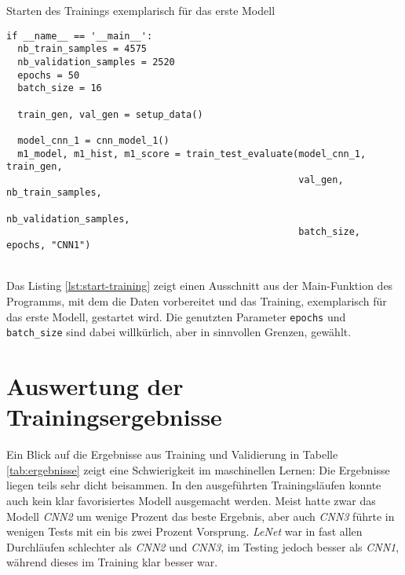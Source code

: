 \begin{listing} [ht]
	\caption{Starten des Trainings exemplarisch für das erste Modell}
	\label{lst:start-training}
	\begin{verbatim}
if __name__ == '__main__':
  nb_train_samples = 4575
  nb_validation_samples = 2520
  epochs = 50
  batch_size = 16

  train_gen, val_gen = setup_data()

  model_cnn_1 = cnn_model_1()
  m1_model, m1_hist, m1_score = train_test_evaluate(model_cnn_1, train_gen,
                                                    val_gen, nb_train_samples,
                                                    nb_validation_samples,
                                                    batch_size, epochs, "CNN1")
	\end{verbatim}
\end{listing} \ \\
Das Listing \ref{lst:start-training} zeigt einen Ausschnitt aus der Main-Funktion des Programms, mit dem die Daten vorbereitet und das Training, exemplarisch für das erste Modell, gestartet wird. Die genutzten Parameter \texttt{epochs} und \texttt{batch\_size} sind dabei willkürlich, aber in sinnvollen Grenzen, gewählt.

\section{Auswertung der Trainingsergebnisse}
Ein Blick auf die Ergebnisse aus Training und Validierung in Tabelle \ref{tab:ergebnisse} zeigt eine Schwierigkeit im maschinellen Lernen: Die Ergebnisse liegen teils sehr dicht beisammen. In den ausgeführten Trainingsläufen konnte auch kein klar favorisiertes Modell ausgemacht werden. Meist hatte zwar das Modell \textit{CNN2} um wenige Prozent das beste Ergebnis, aber auch \textit{CNN3} führte in wenigen Tests mit ein bis zwei Prozent Vorsprung. \textit{LeNet} war in fast allen Durchläufen schlechter als \textit{CNN2} und \textit{CNN3}, im Testing jedoch besser als \textit{CNN1}, während dieses im Training klar besser war.

